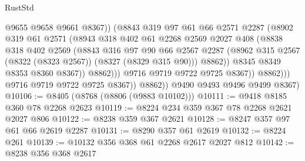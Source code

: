 \begin{lexlean}{RustStd}
\begin{coremodule}
                                @9655
                                @9658
                                @9661
                                @8367))
                            (@8843
                              @319
                              @97
                              @61
                              @66
                              @2571
                              @2287
                              (@8902
                                @319
                                @61
                                @2571
                                (@8943
                                  @318
                                  @402
                                  @61
                                  @2268
                                  @2569
                                  @2027
                                  @408
                                  (@8838
                                    @318
                                    @402
                                    @2569
                                    (@8843
                                      @316
                                      @97
                                      @90
                                      @66
                                      @2567
                                      @2287
                                      (@8962
                                        @315
                                        @2567
                                        (@8322 (@8323 @2567))
                                        (@8327 (@8329 @315 @90)))
                                      @8862))
                                  @8345
                                  @8349
                                  @8353
                                  @8360
                                  @8367))
                              @8862)))
                        @9716
                        @9719
                        @9722
                        @9725
                        @8367))
                    @8862)))
              @9716
              @9719
              @9722
              @9725
              @8367))
          @8862))
      @9490
      @9493
      @9496
      @9499
      @8367)
@10106 := @8405 (@8768 (@8806 (@9883 @10102)))
@10111 := @9418 @8185 @360 @78 @2268 @2623
@10119 := @8224 @234 @359 @367 @78 @2268 @2621 @2027 @806
@10122 := @8238 @359 @367 @2621
@10128 := @8247 @357 @97 @61 @66 @2619 @2287
@10131 := @8290 @357 @61 @2619
@10132 := @8224 @261
@10139 := @10132 @356 @368 @61 @2268 @2617 @2027 @812
@10142 := @8238 @356 @368 @2617

\end{coremodule}
\end{lexlean}
